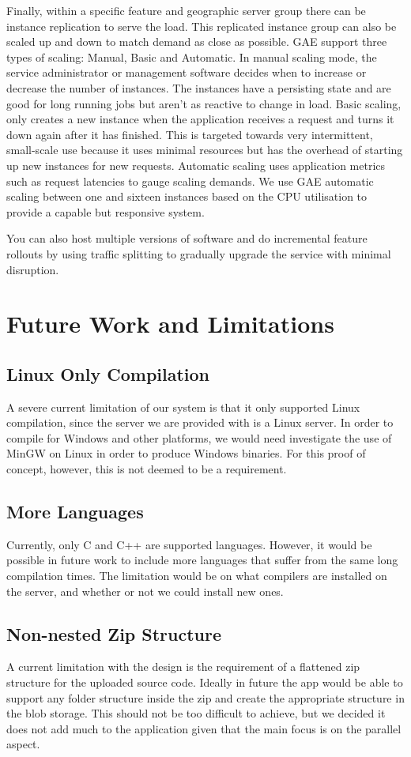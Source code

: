 \documentclass[conference]{IEEEtran}
\begin{document}
Finally, within a specific feature and geographic server group there can be
instance replication to serve the load. This replicated instance group can also
be scaled up and down to match demand as close as possible. GAE support three
types of scaling: Manual, Basic and Automatic. In manual scaling mode, the
service administrator or management software decides when to increase or
decrease the number of instances. The instances have a persisting state and are
good for long running jobs but aren't as reactive to change in load. Basic
scaling, only creates a new instance when the application receives a request and
turns it down again after it has finished. This is targeted towards very
intermittent, small-scale use because it uses minimal resources but has the
overhead of starting up new instances for new requests. Automatic scaling uses application metrics such as request latencies to gauge scaling demands. We use GAE automatic scaling between one and sixteen instances based on the CPU utilisation to provide a capable but responsive system.

You can also host multiple versions of software and do incremental feature rollouts by using traffic splitting to gradually upgrade the service with minimal disruption.


\section{Future Work and Limitations}
\subsection{Linux Only Compilation}
A severe current limitation of our system is that it only supported Linux
compilation, since the server we are provided with is a Linux server. In order
to compile for Windows and other platforms, we would need investigate the use of
MinGW on Linux in order to produce Windows binaries. For this proof of concept,
however, this is not deemed to be a requirement.
\subsection{More Languages}
Currently, only C and C++ are supported languages. However, it would be possible
in future work to include more languages that suffer from the same long
compilation times. The limitation would be on what compilers are installed on
the server, and whether or not we could install new ones.
\subsection{Non-nested Zip Structure}
A current limitation with the design is the requirement of a flattened zip
structure for the uploaded source code. Ideally in future the app would be able
to support any folder structure inside the zip and create the appropriate
structure in the blob storage. This should not be too difficult to achieve, but
we decided it does not add much to the application given that the main focus is
on the parallel aspect.
\end{document}
